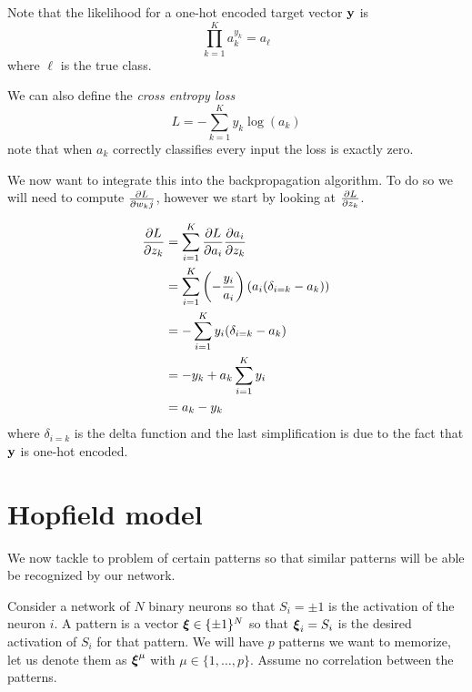 \documentclass[12pt]{extarticle}
\renewcommand{\vec}[1]{\bvec{#1}}
\begin{document}
Note that the likelihood for a one-hot encoded target vector $\vec y$ is
\begin{equation}
	\prod_{k = 1}^K a^{y_k}_k = a_\ell
\end{equation}
where $\ell$ is the true class.

We can also define the \emph{cross entropy loss}
\begin{equation}
	L = - \sum_{k = 1}^{K} y_k \log (a_k)
\end{equation}
note that when $a_k$ correctly classifies every input the loss is exactly zero.

We now want to integrate this into the backpropagation algorithm. To do so we will need to compute
$\pdv{L}{w_kj}$, however we start by looking at $\pdv{L}{z_k}$.

\begin{align}
	\pdv{L}{z_k} & = \sum_{i = 1}^{K} \pdv{L}{a_i} \pdv{a_i}{z_k}                                                \\
	             & = \sum_{i = 1}^{K} \left( - \frac{y_i}{a_i} \right) \left( a_i (\delta_{i = k} - a_k) \right) \\
	             & = - \sum_{i = 1}^{K} y_i (\delta_{i = k} - a_k)                                               \\
	             & = - y_k + a_k \sum_{i = 1}^{K} y_i                                                            \\
	             & = a_k - y_k
\end{align}
where $\delta_{i = k}$ is the delta function and the last simplification is due to the fact that
$\vec y$ is one-hot encoded.

\section{Hopfield model}

We now tackle to problem of  certain patterns so that similar patterns will be able
be recognized by our network.

Consider a network of $N$ binary neurons so that $S_i = \pm 1$ is the activation of the neuron $i$.
A pattern is a vector $\vec \xi \in \{\pm 1\}^N$ so that $\vec \xi_i = S_i$ is the desired
activation of $S_i$ for that pattern. We will have $p$ patterns we want to memorize, let us denote
them as $\vec \xi^\mu$ with $\mu \in \{1, \dots, p\}$.
Assume no correlation between the patterns.
\end{document}
